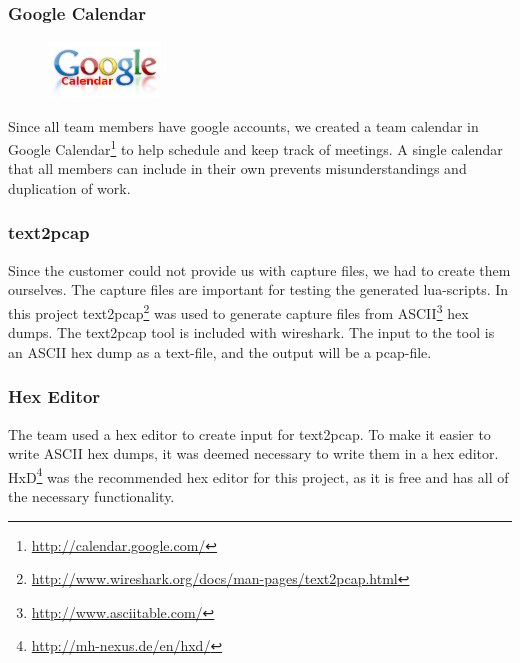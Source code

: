 \subsubsection{Google Calendar}
\begin{figure}
	\vspace{-20pt}
	\includegraphics[width=3cm]{./planning/img/google_calendar_logo}
	\vspace{-20pt}
\end{figure}
Since all team members have google accounts, we created a team calendar
in Google Calendar\footnote{\url{http://calendar.google.com/}}
to help schedule and keep track of meetings. A single calendar that all
members can include in their own prevents misunderstandings and duplication
of work.

\subsubsection{text2pcap}
Since the customer could not provide us with capture files, 
we had to create them ourselves.  The capture files are important for testing
the generated \Gls{lua}-\glspl{script}. In this project text2pcap\footnote{\url{http://www.wireshark.org/docs/man-pages/text2pcap.html}} 
was used to generate capture files from ASCII\footnote{\url{http://www.asciitable.com/}}
\glspl{hex dump}.  The text2pcap tool is included with \Gls{wireshark}. 
The input to the tool is an ASCII \gls{hex dump} as a text-file, and the output will
be a \gls{pcap-file}.

\subsubsection{Hex Editor}
The team used a hex editor to create input for text2pcap. To make it
easier to write ASCII \glspl{hex dump}, it was deemed necessary to write them in a hex editor.
HxD\footnote{\url{http://mh-nexus.de/en/hxd/}} was the recommended hex editor
for this project, as it is free and has all of the necessary functionality.

